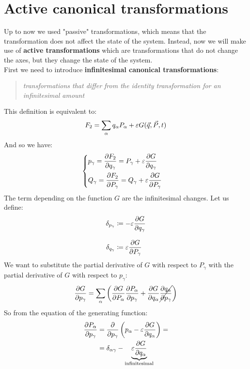 \section{Active canonical transformations}
Up to now we used "passive" transformations, which means that the transformation does not affect the state of the system. Instead, now we will make use of \textbf{active transformations} which are transformations that do not change the axes, but they change the state of the system.\\
First we need to introduce \textbf{infinitesimal canonical transformations}:
\begin{quote}
    \textit{transformations that differ from the identity transformation for an infinitesimal amount}
\end{quote}
This definition is equivalent to:
\begin{equation}
    F_2 = \displaystyle\sum_{\alpha} q_{\alpha}P_{\alpha} + \varepsilon G(\vec{q},\vec{P},t)
\end{equation}
And so we have:
\begin{equation}
    \begin{cases}
        p_{\gamma} = \dfrac{\partial F_2}{\partial q_{\gamma}} = P_{\gamma} + \varepsilon\dfrac{\partial  G}{\partial q_{\gamma}}\\[10pt]
        Q_{\gamma} = \dfrac{\partial F_2}{\partial P_{\gamma}} = Q_{\gamma} + \varepsilon\dfrac{\partial  G}{\partial P_{\gamma}}
    \end{cases}
\end{equation}
The term depending on the function $G$ are the infinitesimal changes. Let us define:
\begin{equation}
    \begin{split}
        \delta_{p_{\gamma}} &\coloneqq -\varepsilon\dfrac{\partial  G}{\partial q_{\gamma}}\\[8pt]
        \delta_{q_{\gamma}} &\coloneqq \varepsilon\dfrac{\partial  G}{\partial P_{\gamma}}
    \end{split}
\end{equation}
We want to substitute the partial derivative of $G$ with respect to $P_{\gamma}$ with the partial derivative of $G$ with respect to $p_{\gamma}$:
\begin{equation}
    \dfrac{\partial G}{\partial p_{\gamma}} = \displaystyle\sum_{\alpha} \left(\dfrac{\partial G}{\partial P_{\alpha}}\dfrac{\partial P_{\alpha}}{\partial p_{\gamma}} + \dfrac{\partial G}{\partial q_{\alpha}}\cancel{\dfrac{\partial q_{\alpha}}{\partial p_{\gamma}}}\right)
\end{equation}
So from the equation of the generating function:
\begin{equation}
    \begin{split}
        \dfrac{\partial P_{\alpha}}{\partial p_{\gamma}} &= \dfrac{\partial }{\partial p_{\gamma}}\left(p_{\alpha} - \varepsilon\dfrac{\partial  G}{\partial q_{\alpha}}\right) = \\
        &= \delta_{\alpha \gamma} - \underbrace{\varepsilon\dfrac{\partial  G}{\partial q_{\alpha}}}_{\text{infinitesimal}}
    \end{split}
\end{equation}
